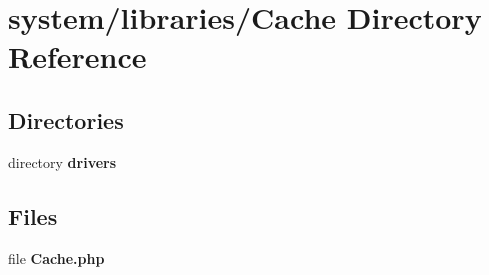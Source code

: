 \section{system/libraries/\-Cache Directory Reference}
\label{dir_d5d71091f62546e90382af567ca752a4}
\subsection*{Directories}
\begin{DoxyCompactItemize}
\item 
directory {\bf drivers}
\end{DoxyCompactItemize}
\subsection*{Files}
\begin{DoxyCompactItemize}
\item 
file {\bf Cache.\-php}
\end{DoxyCompactItemize}
